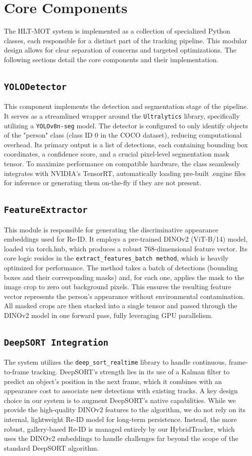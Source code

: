 \documentclass[conference]{IEEEtran}
\begin{document}
\section{Core Components}
The HLT-MOT system is implemented as a collection of specialized Python classes, each responsible for a distinct part of the tracking pipeline. This modular design allows for clear separation of concerns and targeted optimizations. The following sections detail the core components and their implementation.

\subsection{\texttt{YOLODetector}}
This component implements the detection and segmentation stage of the pipeline. It serves as a streamlined wrapper around the \texttt{Ultralytics} library, specifically utilizing a \texttt{YOLOv8n-seg} model. The detector is configured to only identify objects of the "person" class (class ID 0 in the COCO dataset), reducing computational overhead. Its primary output is a list of detections, each containing bounding box coordinates, a confidence score, and a crucial pixel-level segmentation mask tensor. To maximize performance on compatible hardware, the class seamlessly integrates with NVIDIA's TensorRT, automatically loading pre-built .engine files for inference or generating them on-the-fly if they are not present.
\subsection{\texttt{FeatureExtractor}}
This module is responsible for generating the discriminative appearance embeddings used for Re-ID. It employs a pre-trained DINOv2 (ViT-B/14) model, loaded via torch.hub, which produces a robust 768-dimensional feature vector. Its core logic resides in the \texttt{extract\_features\_batch\ method}, which is heavily optimized for performance. The method takes a batch of detections (bounding boxes and their corresponding masks) and, for each one, applies the mask to the image crop to zero out background pixels. This ensures the resulting feature vector represents the person's appearance without environmental contamination. All masked crops are then stacked into a single tensor and passed through the DINOv2 model in one forward pass, fully leveraging GPU parallelism.
\subsection{\texttt{DeepSORT Integration}}
The system utilizes the \texttt{deep\_sort\_realtime} library to handle continuous, frame-to-frame tracking. DeepSORT's strength lies in its use of a Kalman filter to predict an object's position in the next frame, which it combines with an appearance cost to associate new detections with existing tracks. A key design choice in our system is to augment DeepSORT's native capabilities. While we provide the high-quality DINOv2 features to the algorithm, we do not rely on its internal, lightweight Re-ID model for long-term persistence. Instead, the more robust, gallery-based Re-ID is managed entirely by our HybridTracker, which uses the DINOv2 embeddings to handle challenges far beyond the scope of the standard DeepSORT algorithm.
\end{document}
